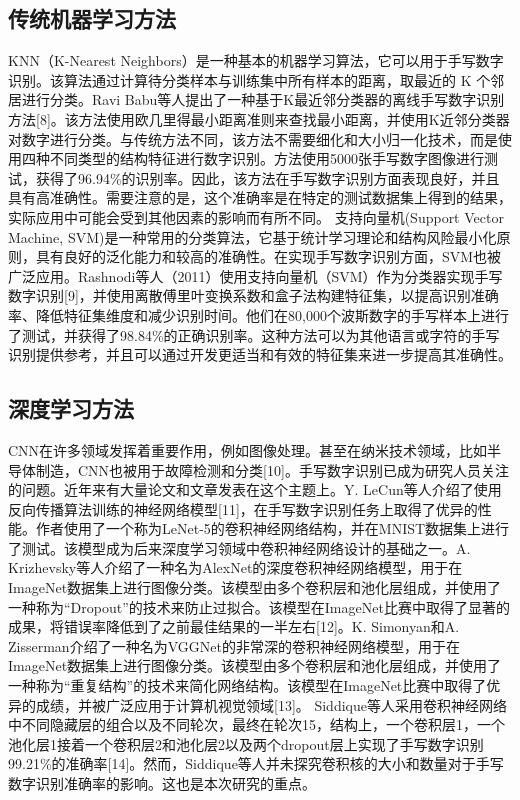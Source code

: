 \documentclass[11pt]{article}
\begin{document}
\subsection{传统机器学习方法}
\label{sec:orgda1a6c6}
KNN（K-Nearest Neighbors）是一种基本的机器学习算法，它可以用于手写数字识别。该算法通过计算待分类样本与训练集中所有样本的距离，取最近的 K 个邻居进行分类。Ravi Babu等人提出了一种基于K最近邻分类器的离线手写数字识别方法[8]。该方法使用欧几里得最小距离准则来查找最小距离，并使用K近邻分类器对数字进行分类。与传统方法不同，该方法不需要细化和大小归一化技术，而是使用四种不同类型的结构特征进行数字识别。方法使用5000张手写数字图像进行测试，获得了96.94\%的识别率。因此，该方法在手写数字识别方面表现良好，并且具有高准确性。需要注意的是，这个准确率是在特定的测试数据集上得到的结果，实际应用中可能会受到其他因素的影响而有所不同。
支持向量机(Support Vector Machine, SVM)是一种常用的分类算法，它基于统计学习理论和结构风险最小化原则，具有良好的泛化能力和较高的准确性。在实现手写数字识别方面，SVM也被广泛应用。Rashnodi等人（2011）使用支持向量机（SVM）作为分类器实现手写数字识别[9]，并使用离散傅里叶变换系数和盒子法构建特征集，以提高识别准确率、降低特征集维度和减少识别时间。他们在80,000个波斯数字的手写样本上进行了测试，并获得了98.84\%的正确识别率。这种方法可以为其他语言或字符的手写识别提供参考，并且可以通过开发更适当和有效的特征集来进一步提高其准确性。
\subsection{深度学习方法}
\label{sec:orga069600}
CNN在许多领域发挥着重要作用，例如图像处理。甚至在纳米技术领域，比如半导体制造，CNN也被用于故障检测和分类[10]。手写数字识别已成为研究人员关注的问题。近年来有大量论文和文章发表在这个主题上。Y. LeCun等人介绍了使用反向传播算法训练的神经网络模型[11]，在手写数字识别任务上取得了优异的性能。作者使用了一个称为LeNet-5的卷积神经网络结构，并在MNIST数据集上进行了测试。该模型成为后来深度学习领域中卷积神经网络设计的基础之一。A. Krizhevsky等人介绍了一种名为AlexNet的深度卷积神经网络模型，用于在ImageNet数据集上进行图像分类。该模型由多个卷积层和池化层组成，并使用了一种称为“Dropout”的技术来防止过拟合。该模型在ImageNet比赛中取得了显著的成果，将错误率降低到了之前最佳结果的一半左右[12]。K. Simonyan和A. Zisserman介绍了一种名为VGGNet的非常深的卷积神经网络模型，用于在ImageNet数据集上进行图像分类。该模型由多个卷积层和池化层组成，并使用了一种称为“重复结构”的技术来简化网络结构。该模型在ImageNet比赛中取得了优异的成绩，并被广泛应用于计算机视觉领域[13]。
Siddique等人采用卷积神经网络中不同隐藏层的组合以及不同轮次，最终在轮次15，结构上，一个卷积层1，一个池化层1接着一个卷积层2和池化层2以及两个dropout层上实现了手写数字识别99.21\%的准确率[14]。然而，Siddique等人并未探究卷积核的大小和数量对于手写数字识别准确率的影响。这也是本次研究的重点。
\end{document}
